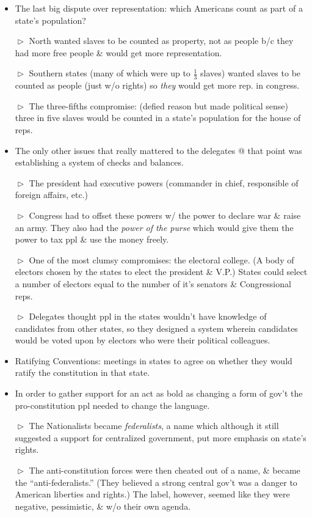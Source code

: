 \documentclass[10pt]{article}
\begin{document}
\begin{flushleft}
\begin{multicols}{2}
\begin{itemize}
\item The last big dispute over representation: which Americans count as part of a state's population?
\item[$\vartriangleright$] North wanted slaves to be counted as property, not as people b/c they had more free people \& would get more representation.
\item[$\vartriangleright$] Southern states (many of which were up to $\frac{1}{3}$ slaves) wanted slaves to be counted as people (just w/o rights) so \textit{they} would get more rep. in congress.
\item[$\vartriangleright$] The three-fifths compromise: (defied reason but made political sense) three in five slaves would be counted in a state's population for the house of reps.
\item The only other issues that really mattered to the delegates @ that point was establishing a system of checks and balances.
\item[$\vartriangleright$] The president had executive powers (commander in chief, responsible of foreign affairs, etc.)
\item[$\vartriangleright$] Congress had to offset these powers w/ the power to declare war \& raise an army. They also had the \textit{power of the purse} which would give them the power to tax ppl \& use the money freely.
\item[$\vartriangleright$] One of the most clumsy compromises: the electoral college. (A body of electors chosen by the states to elect the president \& V.P.) States could select a number of electors equal to the number of it's senators \& Congressional reps.
\item[$\vartriangleright$] Delegates thought ppl in the states wouldn't have knowledge of candidates from other states, so they designed a system wherein candidates would be voted upon by electors who were their political colleagues. 
\item Ratifying Conventions: meetings in states to agree on whether they would ratify the constitution in that state.
\item In order to gather support for an act as bold as changing a form of gov't the pro-constitution ppl needed to change the language.
\item[$\vartriangleright$] The Nationalists became \textit{federalists}, a name which although it still suggested a support for centralized government, put more emphasis on state's rights.
\item[$\vartriangleright$] The anti-constitution forces were then cheated out of a name, \& became the ``anti-federalists.'' (They believed a strong central gov't was a danger to American liberties and rights.) The label, however, seemed like they were negative, pessimistic, \& w/o their own agenda.

\end{itemize}
\end{multicols}
\end{flushleft}
\end{document}
